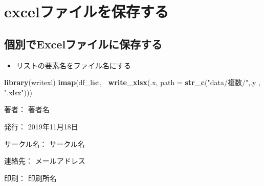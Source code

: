 \documentclass[
  xelatex,ja=standard, b5paper]{bxjsbook}
\newenvironment{Shaded}{\begin{snugshade}}{\end{snugshade}}
\newcommand{\DataTypeTok}[1]{\textcolor[rgb]{0.13,0.29,0.53}{#1}}
\newcommand{\KeywordTok}[1]{\textcolor[rgb]{0.13,0.29,0.53}{\textbf{#1}}}
\newcommand{\NormalTok}[1]{#1}
\newcommand{\OperatorTok}[1]{\textcolor[rgb]{0.81,0.36,0.00}{\textbf{#1}}}
\newcommand{\StringTok}[1]{\textcolor[rgb]{0.31,0.60,0.02}{#1}}
\providecommand{\tightlist}{%
  \setlength{\itemsep}{0pt}\setlength{\parskip}{0pt}}
\begin{document}
\hypertarget{writingexcel}{%
\part{excelファイルを保存する}\label{writingexcel}}

\hypertarget{ux500bux5225ux3067excelux30d5ux30a1ux30a4ux30ebux306bux4fddux5b58ux3059ux308b}{%
\chapter{個別でExcelファイルに保存する}\label{ux500bux5225ux3067excelux30d5ux30a1ux30a4ux30ebux306bux4fddux5b58ux3059ux308b}}

\begin{itemize}
\tightlist
\item
  リストの要素名をファイル名にする
\end{itemize}

\begin{Shaded}
\begin{Highlighting}[]
\KeywordTok{library}\NormalTok{(writexl)}
\KeywordTok{imap}\NormalTok{(df_list, }\OperatorTok{~}\KeywordTok{write_xlsx}\NormalTok{(.x, }\DataTypeTok{path =} \KeywordTok{str_c}\NormalTok{(}\StringTok{"data/複数/"}\NormalTok{,.y , }\StringTok{".xlsx"}\NormalTok{)))}
\end{Highlighting}
\end{Shaded}

\clearpage
{}
\begin{flushright}
\begin{minipage}{0.5\hsize}
\begin{description}
  \item{著者：} 著者名
  \item{発行：} 2019年11月18日
  \item{サークル名：} サークル名
  \item{連絡先：} メールアドレス
  \item{印刷：} 印刷所名
\end{description}
\end{minipage}
\end{flushright}
\clearpage
\end{document}
